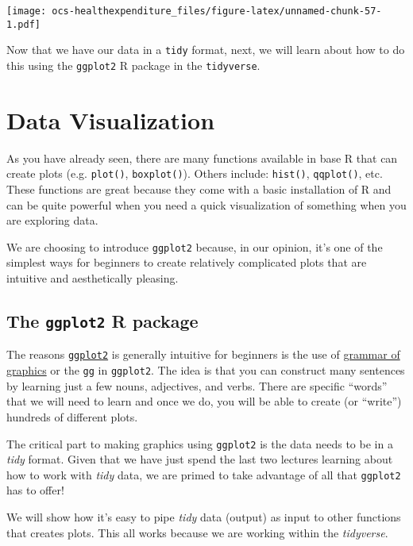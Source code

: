 \documentclass[]{article}
\begin{document}
\texttt{[image: ocs-healthexpenditure\_files/figure-latex/unnamed-chunk-57-1.pdf]}

Now that we have our data in a \texttt{tidy} format, next, we will learn
about how to do this using the \texttt{ggplot2} R package in the
\texttt{tidyverse}.

\hypertarget{data-visualization}{%
\section{Data Visualization}\label{data-visualization}}

As you have already seen, there are many functions available in base R
that can create plots (e.g. \texttt{plot()}, \texttt{boxplot()}). Others
include: \texttt{hist()}, \texttt{qqplot()}, etc. These functions are
great because they come with a basic installation of R and can be quite
powerful when you need a quick visualization of something when you are
exploring data.

We are choosing to introduce \texttt{ggplot2} because, in our opinion,
it's one of the simplest ways for beginners to create relatively
complicated plots that are intuitive and aesthetically pleasing.

\hypertarget{the-ggplot2-r-package}{%
\subsection{\texorpdfstring{The \texttt{ggplot2} R
package}{The ggplot2 R package}}\label{the-ggplot2-r-package}}

The reasons \href{http://ggplot2.tidyverse.org}{\texttt{ggplot2}} is
generally intuitive for beginners is the use of
\href{http://vita.had.co.nz/papers/layered-grammar.html}{grammar of
graphics} or the \texttt{gg} in \texttt{ggplot2}. The idea is that you
can construct many sentences by learning just a few nouns, adjectives,
and verbs. There are specific ``words'' that we will need to learn and
once we do, you will be able to create (or ``write'') hundreds of
different plots.

The critical part to making graphics using \texttt{ggplot2} is the data
needs to be in a \emph{tidy} format. Given that we have just spend the
last two lectures learning about how to work with \emph{tidy} data, we
are primed to take advantage of all that \texttt{ggplot2} has to offer!

We will show how it's easy to pipe \emph{tidy} data (output) as input to
other functions that creates plots. This all works because we are
working within the \emph{tidyverse}.
\end{document}
